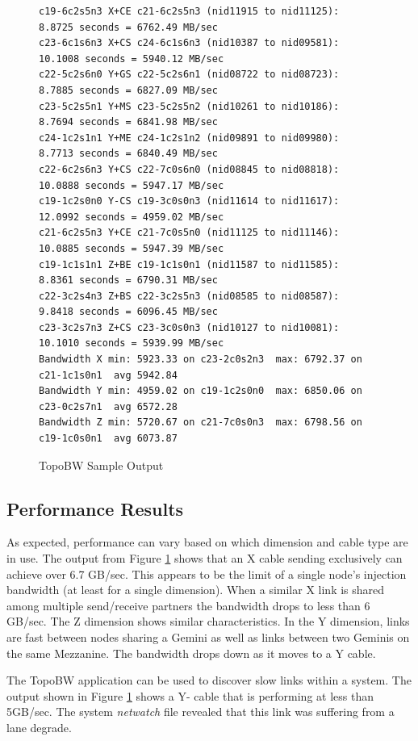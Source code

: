 \documentclass[10pt, conference, compsocconf]{IEEEtran}
\begin{document}
\begin{figure}[ht]
  \begin{verbatim}
c19-6c2s5n3 X+CE c21-6c2s5n3 (nid11915 to nid11125):  8.8725 seconds = 6762.49 MB/sec
c23-6c1s6n3 X+CS c24-6c1s6n3 (nid10387 to nid09581): 10.1008 seconds = 5940.12 MB/sec
c22-5c2s6n0 Y+GS c22-5c2s6n1 (nid08722 to nid08723):  8.7885 seconds = 6827.09 MB/sec
c23-5c2s5n1 Y+MS c23-5c2s5n2 (nid10261 to nid10186):  8.7694 seconds = 6841.98 MB/sec
c24-1c2s1n1 Y+ME c24-1c2s1n2 (nid09891 to nid09980):  8.7713 seconds = 6840.49 MB/sec
c22-6c2s6n3 Y+CS c22-7c0s6n0 (nid08845 to nid08818): 10.0888 seconds = 5947.17 MB/sec
c19-1c2s0n0 Y-CS c19-3c0s0n3 (nid11614 to nid11617): 12.0992 seconds = 4959.02 MB/sec
c21-6c2s5n3 Y+CE c21-7c0s5n0 (nid11125 to nid11146): 10.0885 seconds = 5947.39 MB/sec
c19-1c1s1n1 Z+BE c19-1c1s0n1 (nid11587 to nid11585):  8.8361 seconds = 6790.31 MB/sec
c22-3c2s4n3 Z+BS c22-3c2s5n3 (nid08585 to nid08587):  9.8418 seconds = 6096.45 MB/sec
c23-3c2s7n3 Z+CS c23-3c0s0n3 (nid10127 to nid10081): 10.1010 seconds = 5939.99 MB/sec
Bandwidth X min: 5923.33 on c23-2c0s2n3  max: 6792.37 on c21-1c1s0n1  avg 5942.84
Bandwidth Y min: 4959.02 on c19-1c2s0n0  max: 6850.06 on c23-0c2s7n1  avg 6572.28
Bandwidth Z min: 5720.67 on c21-7c0s0n3  max: 6798.56 on c19-1c0s0n1  avg 6073.87
  \end{verbatim}
  \caption{TopoBW Sample Output}\label{fig:topobwresults}
\end{figure}

\subsection{Performance Results}

As expected, performance can vary based on which dimension and cable type are
in use.  The output from Figure \ref{fig:topobwresults} shows that an X cable
sending exclusively can achieve over 6.7 GB/sec.  This appears to be the limit
of a single node's injection bandwidth (at least for a single dimension).  When
a similar X link is shared among multiple send/receive partners the bandwidth
drops to less than 6 GB/sec.  The Z dimension shows similar characteristics.
In the Y dimension, links are fast between nodes sharing a Gemini as well as
links between two Geminis on the same Mezzanine.  The bandwidth drops down as
it moves to a Y cable.

The TopoBW application can be used to discover slow links within a system.  The
output shown in Figure \ref{fig:topobwresults} shows a Y- cable that is
performing at less than 5GB/sec.  The system \emph{netwatch} file revealed that
this link was suffering from a lane degrade.
\end{document}

